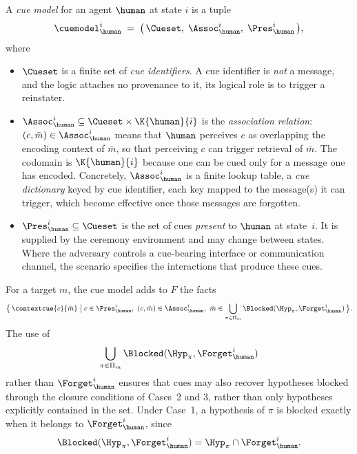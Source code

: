 \begin{definition}
\label{Def:CueModel}
    A \emph{cue model} for an agent $\human$ at state $i$ is a tuple
    \[
        \cuemodel_\human^{i} \;=\; \bigl(\, \Cueset,\; \Assoc_{\human}^{i},\; \Pres_{\human}^{i} \,\bigr),
    \]
    where
    \begin{itemize}[nosep]
        \item $\Cueset$ is a finite set of \emph{cue identifiers}. A cue identifier is \emph{not} a message, and the logic attaches no provenance to it, its logical role is to trigger a reinstater.
        \item $\Assoc_{\human}^{i} \subseteq \Cueset \times \K{\human}{i}$ is the \emph{association relation}: $(c, \bar{m}) \in \Assoc_{\human}^{i}$ means that $\human$ perceives $c$ as overlapping the encoding context of $\bar{m}$, so that perceiving $c$ can trigger retrieval of $\bar{m}$. The codomain is $\K{\human}{i}$ because one can be cued only for a message one has encoded. Concretely, $\Assoc_{\human}^{i}$ is a finite lookup table, a \emph{cue dictionary} keyed by cue identifier, each key mapped to the message(s) it can trigger, which become effective once those messages are forgotten.
        \item $\Pres_{\human}^{i} \subseteq \Cueset$ is the set of cues \emph{present} to $\human$ at state~$i$. It is supplied by the ceremony environment and may change between states. Where the adversary controls a cue-bearing interface or communication channel, the scenario specifies the interactions that produce these cues.
        \end{itemize}
\end{definition}

For a target $m$, the cue model adds to $F$ the facts
\[
  \bigl\{\,
    \contextcue{c}{\bar m}
    \bigm|
    c\in\Pres_{\human}^{i},\
    (c,\bar m)\in\Assoc_{\human}^{i},\
    \bar m\in
    \bigcup_{\pi\in\Pi_m}
    \Blocked(\Hyp_\pi,\Forget_{\human}^{i})
  \,\bigr\}.
\]
The use of
\[
  \bigcup_{\pi\in\Pi_m}   \Blocked(\Hyp_\pi,\Forget_{\human}^{i})
\]
rather than $\Forget_{\human}^{i}$ ensures that cues may also recover hypotheses blocked through the closure conditions of Cases~2 and 3, rather than only hypotheses explicitly contained in the \Forget{} set. Under Case~1, a hypothesis of $\pi$ is blocked exactly when it belongs to $\Forget_{\human}^{i}$, since
\[
  \Blocked(\Hyp_\pi,\Forget_{\human}^{i}) = \Hyp_\pi\cap\Forget_{\human}^{i}.
\]

